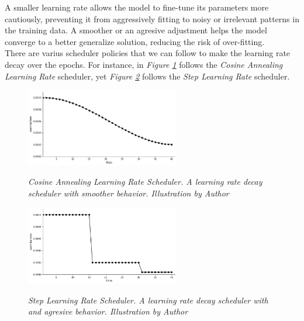 \begin{itemize}
\begin{itemize}
    A smaller learning rate allows the model to fine-tune its parameters more cautiously,
    preventing it from aggressively fitting to noisy or irrelevant patterns in the training data.
    A smoother or an agresive adjustment helps the model converge to a better generalize solution,
    reducing the risk of over-fitting. \\

    There are varius scheduler policies that we can follow to make the learning rate decay over
    the epochs. For instance, in \textit{Figure \ref{fig:learning-rate-decay-cosine-annealing}} follows the \textit{Cosine Annealing Learning Rate} scheduler, yet
    \textit{Figure \ref{fig:learning-rate-decay-step}} follows the \textit{Step Learning Rate} scheduler.

    \begin{figure}[H]
    \centering
    \includegraphics[width=0.6\textwidth]{imatges/preliminaries/cosinus-scheduler.png}
    \caption[Cosine Annealing Learning Rate Scheduler]{\textit{Cosine Annealing Learning Rate Scheduler. A learning rate decay scheduler with smoother behavior.
      Illustration by Author}}
    {\label{fig:learning-rate-decay-cosine-annealing}}
    \end{figure}

    \begin{figure}[H]
    \centering
    \includegraphics[width=0.6\textwidth]{imatges/preliminaries/step-scheduler.png}
    \caption[Step Learning Rate Scheduler]{\textit{Step Learning Rate Scheduler. A learning rate decay scheduler with
      and agresive behavior. Illustration by Author}}
    {\label{fig:learning-rate-decay-step}}
    \end{figure}


\end{itemize}
\end{itemize}

